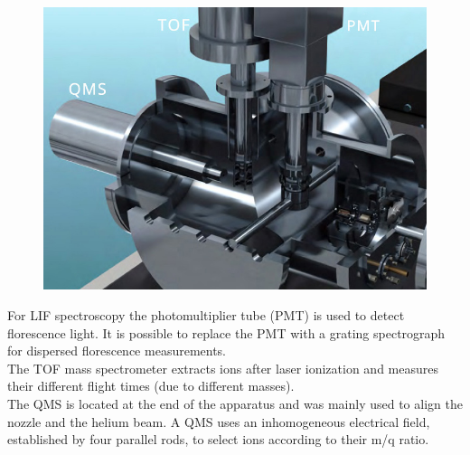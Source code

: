 \documentclass[parskip,12pt,headsepline,a4paper] {scrbook}
\begin{document}
\begin{figure}[ht]
\centerline{
\includegraphics[width=15cm]{./experimental_setup/detection-chamber.jpg}}
\end{figure}

For LIF spectroscopy the photomultiplier tube (PMT) is used to detect florescence light. It is possible to replace the PMT with a grating spectrograph for dispersed florescence measurements. \\
The TOF mass spectrometer extracts ions after laser ionization and measures their different flight times (due to different masses). \\
The QMS is located at the end of the apparatus and was mainly used to align the nozzle and the helium beam. A QMS uses an inhomogeneous electrical field, established by four parallel rods, to select ions according to their m/q ratio.
\end{document}
